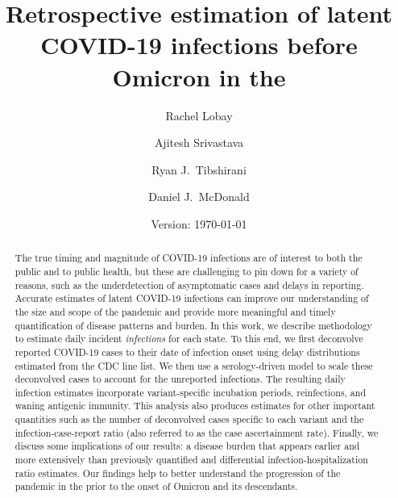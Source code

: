 \documentclass{article}
\begin{document}
\title{Retrospective estimation of latent COVID-19 infections before Omicron in the \US}
\author[a,1]{Rachel Lobay}
\author[b]{Ajitesh Srivastava}
\author[c]{Ryan J.\ Tibshirani}
\author[a]{Daniel J.\ McDonald}





\date{Version: \today}
\maketitle

\begin{abstract}
The true timing and magnitude of COVID-19 infections are of interest to both the
public and to public health, but these are challenging to pin down for a variety
of reasons, such as the underdetection of asymptomatic cases and delays in
reporting. Accurate estimates of latent COVID-19 infections can improve our
understanding of the size and scope of the pandemic and provide more meaningful
and timely quantification of disease patterns and burden. In this work, we
describe methodology to estimate daily incident \emph{infections} for each \US
state. To this end, we first deconvolve reported COVID-19 cases to their date of
infection onset using delay distributions estimated from the CDC line list. We
then use a serology-driven model to scale these deconvolved cases to account for
the unreported infections. The resulting daily infection estimates
incorporate variant-specific incubation periods, reinfections,
and waning antigenic immunity. This analysis also produces estimates for other
important quantities such as the number of deconvolved cases specific to each
variant and the infection-case-report ratio (also referred to as the case
ascertainment rate). Finally, we discuss some implications of our results: a
disease burden that appears earlier and more extensively than previously
quantified and differential infection-hospitalization ratio estimates. Our
findings help to better understand the progression of the pandemic in the \US
prior to the onset of Omicron and its descendants. 

\end{abstract}
\end{document}
